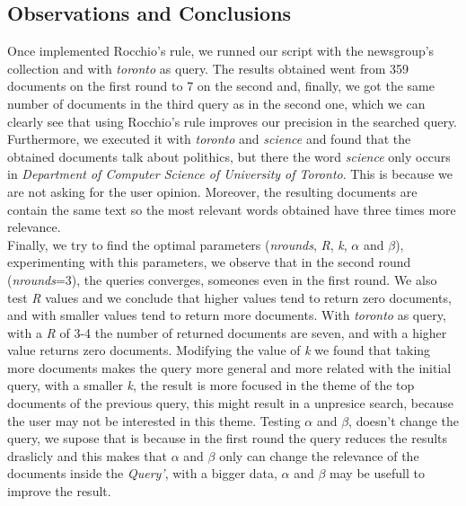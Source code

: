 \documentclass[11pt]{article}
\begin{document}
\subsection{Observations and Conclusions}
Once implemented Rocchio's rule, we runned our script with the newsgroup's collection and with \textit{toronto} as query. The results obtained went from 359 documents on the first round to 7 on the second and, finally, we got the same number of documents in the third query as in the second one, which we can clearly see that using Rocchio's rule improves our precision in the searched query.\\
Furthermore, we executed it with \textit{toronto} and \textit{science} and found that the obtained documents talk about polithics, but there the word \textit{science} only occurs in \textit{Department of Computer Science of University of Toronto}. This is because we are not asking for the user opinion. Moreover, the resulting documents are contain the same text so the most relevant words obtained have three times more relevance.\\
Finally, we try to find the optimal parameters (\textit{nrounds}, \textit{R}, \textit{k}, $\alpha$ and $\beta$), experimenting with this parameters, we observe that in the second round (\textit{nrounds}=3), the queries converges, someones even in the first round. We also test \textit{R} values and we conclude that higher values tend to return zero documents, and with smaller values tend to return more documents. With \textit{toronto} as query, with a \textit{R} of 3-4 the number of returned documents are seven, and with a higher value returns zero documents. Modifying the value of \textit{k} we found that taking more documents makes the query more general and more related with the initial query, with a smaller \textit{k}, the result is more focused in the theme of the top documents of the previous query, this might result in a unpresice search, because the user may not be interested in this theme. Testing $\alpha$ and $\beta$, doesn't change the query, we supose that is because in the first round the query reduces the results draslicly and this makes that $\alpha$ and $\beta$ only can change the relevance of the documents inside the \textit{Query'}, with a bigger data, $\alpha$ and $\beta$  may be usefull to improve the result.
\end{document}
